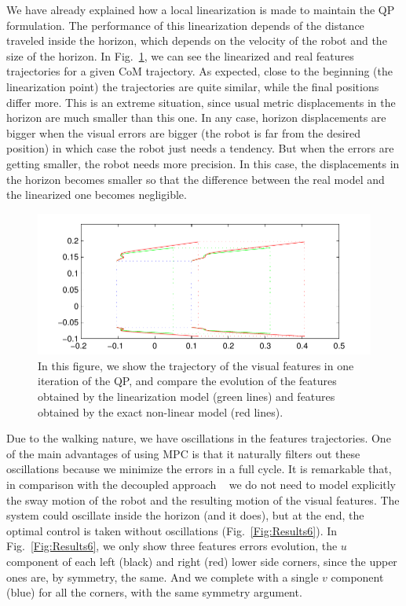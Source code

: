 We have already explained how a local linearization is made to maintain the QP formulation. The performance of this linearization depends of the distance traveled inside the horizon, which depends on the velocity of the robot and the size of the horizon. In Fig.~\ref{Fig:Results5}, we can see the linearized and real features trajectories for a given CoM trajectory. As expected, close to the beginning (the linearization point) the trajectories are quite similar, while the final positions differ more. This is an extreme situation, since usual metric displacements in the horizon are much smaller than this one. In any case, horizon displacements are bigger when the visual errors are bigger (the robot is far from the desired position) in which case the robot just needs a tendency. But when the errors are getting smaller, the robot needs more precision. In this case, the displacements in the horizon becomes smaller so that the difference between the real model and the linearized one becomes negligible.

\begin{figure}[h]
 \centering
 \includegraphics[scale=.8]{Chap4-Visual-Servoing/comparison_linearization}
 \caption{\label{Fig:Results5}\small{In this figure, we show the trajectory of the visual features in one iteration of the QP, and compare the evolution of the features obtained by the linearization model (green lines) and features obtained by the exact non-linear model (red lines).}}
 \end{figure}

Due to the walking nature, we have oscillations in the features trajectories. One of the main advantages of using MPC is that it naturally filters out these oscillations because we minimize the errors in a full cycle. It is remarkable that, in comparison with the decoupled approach ~\cite{DuneIROS2010} we do not need to model explicitly the sway motion of the robot and the resulting motion of the visual features. The system could oscillate inside the horizon (and it does), but at the end, the optimal control is taken without oscillations (Fig.~\ref{Fig:Results6}). In Fig.~\ref{Fig:Results6}, we only show three features errors evolution, the $u$ component of each left (black) and right (red) lower side corners, since the upper ones are, by symmetry, the same. And we complete with a single $v$ component (blue) for all the corners, with the same symmetry argument. 

